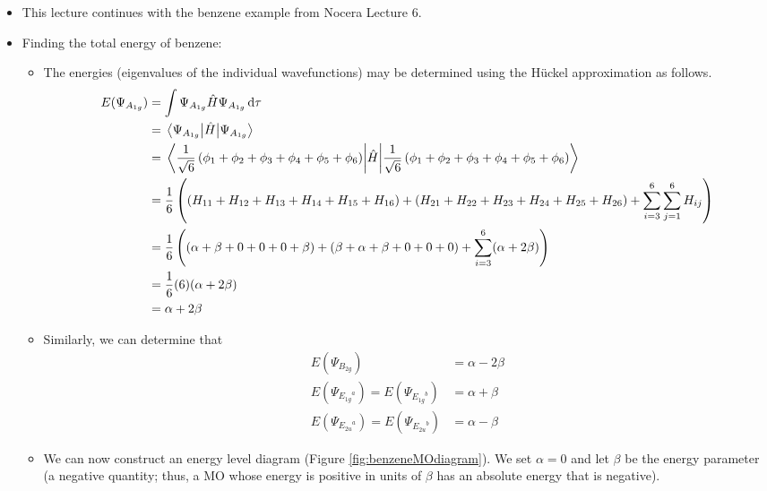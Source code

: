 \documentclass[../notes.tex]{subfiles}
\begin{document}
\begin{itemize}
    \item This lecture continues with the benzene example from Nocera Lecture 6.
    \item Finding the total energy of benzene:
    \begin{itemize}
        \item The energies (eigenvalues of the individual wavefunctions) may be determined using the H\"{u}ckel approximation as follows.
        \begin{align*}
            E(\Psi_{A_{1g}}) &= \int\Psi_{A_{1g}}\hat{H}\Psi_{A_{1g}}\dd{\tau}\\
            &= \ev{\hat{H}}{\Psi_{A_{1g}}}\\
            &= \ev{\hat{H}}{\frac{1}{\sqrt{6}}\left( \phi_1+\phi_2+\phi_3+\phi_4+\phi_5+\phi_6 \right)}\\
            &= \frac{1}{6}\left( \left( H_{11}+H_{12}+H_{13}+H_{14}+H_{15}+H_{16} \right)+\left( H_{21}+H_{22}+H_{23}+H_{24}+H_{25}+H_{26} \right)+\sum_{i=3}^6\sum_{j=1}^6H_{ij} \right)\\
            &= \frac{1}{6}\left( \left( \alpha+\beta+0+0+0+\beta \right)+\left( \beta+\alpha+\beta+0+0+0 \right)+\sum_{i=3}^6(\alpha+2\beta) \right)\\
            &= \frac{1}{6}(6)(\alpha+2\beta)\\
            &= \alpha+2\beta
        \end{align*}
        \item Similarly, we can determine that
        \begin{align*}
            E(\Psi_{B_{2g}}) &= \alpha-2\beta\\
            E(\Psi_{{E_{1g}}^a}) = E(\Psi_{{E_{1g}}^b}) &= \alpha+\beta\\
            E(\Psi_{{E_{2u}}^a}) = E(\Psi_{{E_{2u}}^b}) &= \alpha-\beta
        \end{align*}
        \item We can now construct an energy level diagram (Figure \ref{fig:benzeneMOdiagram}). We set $\alpha=0$ and let $\beta$ be the energy parameter (a negative quantity; thus, a MO whose energy is positive in units of $\beta$ has an absolute energy that is negative).
        \begin{figure}[h!]
            \centering
\end{figure}
\end{itemize}
\end{itemize}
\end{document}
